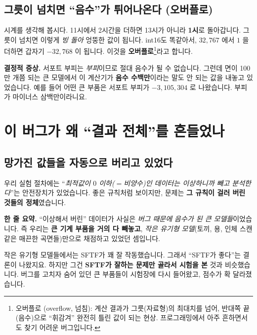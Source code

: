 \documentclass[11pt,a4paper]{article}
\begin{document}
\subsection{그릇이 넘치면 ``음수''가 튀어나온다 (오버플로)}

시계를 생각해 봅시다. 11시에서 2시간을 더하면 13시가 아니라 \textbf{1시}로 돌아갑니다.
그릇이 넘치면 이렇게 \emph{빙 돌아} 엉뚱한 값이 됩니다. int16도 똑같아서, $32{,}767$ 에서
$1$ 을 더하면 갑자기 $-32{,}768$ 이 됩니다. 이것을 \textbf{오버플로}\footnote{오버플로
(overflow, 넘침): 계산 결과가 그릇(자료형)의 최대치를 넘어, 반대쪽 끝(음수)으로
``휘감겨'' 완전히 틀린 값이 되는 현상. 프로그래밍에서 아주 흔하면서도 찾기 어려운
버그입니다.}라고 합니다.

\begin{warnbox}
\textbf{결정적 증상.} 서포트 부피는 \emph{부피}이므로 절대 음수가 될 수 없습니다.
그런데 면이 100만 개쯤 되는 큰 모델에서 이 계산기가 \textbf{음수 수백만}이라는
말도 안 되는 값을 내놓고 있었습니다. 예를 들어 어떤 큰 부품은 서포트 부피가
$-3{,}105{,}304$ 로 나왔습니다. 부피가 마이너스 삼백만이라니요.
\end{warnbox}

\section{이 버그가 왜 ``결과 전체''를 흔들었나}

\subsection{망가진 값들을 자동으로 버리고 있었다}

우리 실험 절차에는 ``\emph{최적값이 $0$ 이하($=$비양수)인 데이터는 이상하니까
빼고 분석한다}''는 안전장치가 있었습니다. 좋은 규칙처럼 보이지만, 문제는
\textbf{그 규칙이 걸러 버린 것들의 정체}였습니다.

\begin{readbox}
\textbf{한 줄 요약.} ``이상해서 버린'' 데이터가 사실은 \emph{버그 때문에 음수가 된
큰 모델들}이었습니다. 즉 우리는 \textbf{큰 기계 부품을 거의 다 빼놓고}, \emph{작은
유기형 모델}(토끼, 용, 인체 스캔 같은 매끈한 곡면들)만으로 채점하고 있었던 셈입니다.
\end{readbox}

작은 유기형 모델들에서는 SFTF가 꽤 잘 작동했습니다. 그래서 ``SFTF가 좋다''는 결론이
나왔지요. 하지만 그건 \textbf{SFTF가 잘하는 문제만 골라서 시험을 본} 것과 비슷했습니다.
버그를 고치자 숨어 있던 큰 부품들이 시험장에 다시 들어왔고, 점수가 확 달라졌습니다.
\end{document}
